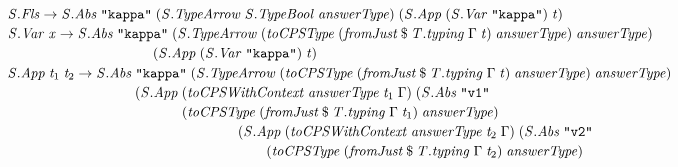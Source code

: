 \documentclass[10pt]{article}
\newcommand{\Conid}[1]{\mathit{#1}}
\newcommand{\Varid}[1]{\mathit{#1}}
\begin{document}
\begin{hscode}
${\hskip1.00em\relax\hskip1.00em\relax\Conid{\Conid{S}.Fls}\to \Conid{\Conid{S}.Abs}\;\text{\tt \char34 kappa\char34}\;(\Conid{\Conid{S}.TypeArrow}\;\Conid{\Conid{S}.TypeBool}\;\Varid{answerType})\;(\Conid{\Conid{S}.App}\;(\Conid{\Conid{S}.Var}\;\text{\tt \char34 kappa\char34})\;\Varid{t})}$\\
${\hskip1.00em\relax\hskip1.00em\relax\Conid{\Conid{S}.Var}\;\Varid{x}\to \Conid{\Conid{S}.Abs}\;\text{\tt \char34 kappa\char34}\;(\Conid{\Conid{S}.TypeArrow}\;(\Varid{toCPSType}\;(\Varid{fromJust}\mathbin{\$}\Varid{\Conid{T}.typing}\;\Gamma\;\Varid{t})\;\Varid{answerType})\;\Varid{answerType})\;}$\\
${\hskip1.00em\relax\hskip1.00em\relax\hskip10.50em\relax(\Conid{\Conid{S}.App}\;(\Conid{\Conid{S}.Var}\;\text{\tt \char34 kappa\char34})\;\Varid{t})}$\\
${\hskip1.00em\relax\hskip1.00em\relax\Conid{\Conid{S}.App}\;\Varid{t}_{1}\;\Varid{t}_{2}\to \Conid{\Conid{S}.Abs}\;\text{\tt \char34 kappa\char34}\;(\Conid{\Conid{S}.TypeArrow}\;(\Varid{toCPSType}\;(\Varid{fromJust}\mathbin{\$}\Varid{\Conid{T}.typing}\;\Gamma\;\Varid{t})\;\Varid{answerType})\;\Varid{answerType})\;}$\\
${\hskip1.00em\relax\hskip1.00em\relax\phantom{\Conid{\Conid{S}.App}\;\Varid{t}_{1}\;\Varid{t}_{2}\to \Conid{\Conid{S}.Abs}\;\mbox{}}(\Conid{\Conid{S}.App}\;(\Varid{toCPSWithContext}\;\Varid{answerType}\;\Varid{t}_{1}\;\Gamma)\;(\Conid{\Conid{S}.Abs}\;\text{\tt \char34 v1\char34}}$\\
${\hskip1.00em\relax\hskip1.00em\relax\phantom{\Conid{\Conid{S}.App}\;\Varid{t}_{1}\;\Varid{t}_{2}\to \Conid{\Conid{S}.Abs}\;\mbox{}}\phantom{(\Conid{\Conid{S}.App}\;\mbox{}}(\Varid{toCPSType}\;(\Varid{fromJust}\mathbin{\$}\Varid{\Conid{T}.typing}\;\Gamma\;\Varid{t}_{1})\;\Varid{answerType})\;}$\\
${\hskip1.00em\relax\hskip1.00em\relax\phantom{\Conid{\Conid{S}.App}\;\Varid{t}_{1}\;\Varid{t}_{2}\to \Conid{\Conid{S}.Abs}\;\mbox{}}\phantom{(\Conid{\Conid{S}.App}\;\mbox{}}\hskip4.00em\relax(\Conid{\Conid{S}.App}\;(\Varid{toCPSWithContext}\;\Varid{answerType}\;\Varid{t}_{2}\;\Gamma)\;(\Conid{\Conid{S}.Abs}\;\text{\tt \char34 v2\char34}}$\\
${\hskip1.00em\relax\hskip1.00em\relax\phantom{\Conid{\Conid{S}.App}\;\Varid{t}_{1}\;\Varid{t}_{2}\to \Conid{\Conid{S}.Abs}\;\mbox{}}\phantom{(\Conid{\Conid{S}.App}\;\mbox{}}\hskip4.00em\relax\hskip2.00em\relax(\Varid{toCPSType}\;(\Varid{fromJust}\mathbin{\$}\Varid{\Conid{T}.typing}\;\Gamma\;\Varid{t}_{2})\;\Varid{answerType})\;}$\\

\end{hscode}
\end{document}
